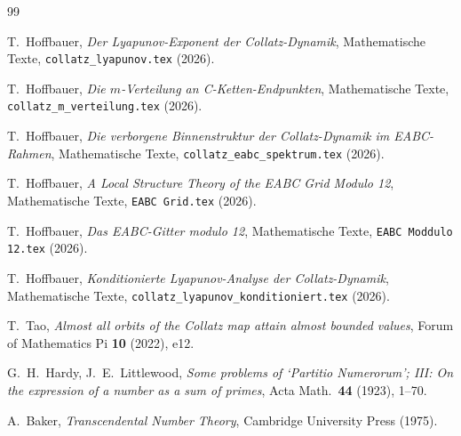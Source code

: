 \documentclass[12pt,a4paper]{article}
\begin{document}
\begin{thebibliography}{99}

T.\ Hoffbauer,
\textit{Der Lyapunov-Exponent der Collatz-Dynamik},
Mathematische Texte, \texttt{collatz\_lyapunov.tex} (2026).

T.\ Hoffbauer,
\textit{Die $m$-Verteilung an C-Ketten-Endpunkten},
Mathematische Texte, \texttt{collatz\_m\_verteilung.tex} (2026).

T.\ Hoffbauer,
\textit{Die verborgene Binnenstruktur der Collatz-Dynamik im EABC-Rahmen},
Mathematische Texte, \texttt{collatz\_eabc\_spektrum.tex} (2026).

T.\ Hoffbauer,
\textit{A Local Structure Theory of the EABC Grid Modulo 12},
Mathematische Texte, \texttt{EABC Grid.tex} (2026).

T.\ Hoffbauer,
\textit{Das EABC-Gitter modulo 12},
Mathematische Texte, \texttt{EABC Moddulo 12.tex} (2026).

T.\ Hoffbauer,
\textit{Konditionierte Lyapunov-Analyse der Collatz-Dynamik},
Mathematische Texte, \texttt{collatz\_lyapunov\_konditioniert.tex} (2026).

T.\ Tao,
\textit{Almost all orbits of the Collatz map attain almost bounded values},
Forum of Mathematics Pi \textbf{10} (2022), e12.

G.\ H.\ Hardy, J.\ E.\ Littlewood,
\textit{Some problems of `Partitio Numerorum'; III: On the expression of a number
as a sum of primes},
Acta Math.\ \textbf{44} (1923), 1--70.

A.\ Baker,
\textit{Transcendental Number Theory},
Cambridge University Press (1975).

\end{thebibliography}
\end{document}
